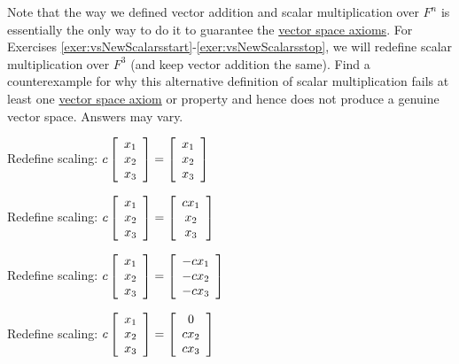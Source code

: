 \noindent Note that the way we defined vector addition and scalar multiplication over \hyperref[note:Fn]{$F^n$} is essentially the only way to do it to guarantee the \hyperref[def:vectorspace]{vector space axioms}. For Exercises \ref{exer:vsNewScalarsstart}-\ref{exer:vsNewScalarsstop}, we will redefine scalar multiplication over $F^3$ (and keep vector addition the same). Find a counterexample for why this alternative definition of scalar multiplication fails at least one \hyperref[def:vectorspace]{vector space axiom} or property and hence does not produce a genuine vector space. Answers may vary.
\begin{enumerate}[!HW!, label=$\spadesuit$ \arabic*., ref=\arabic*]
\begin{multicols}{2}
\item\label{exer:vsNewScalarsstart} Redefine scaling: $c\vr{x_1\\x_2\\x_3} = \vr{x_1\\x_2\\x_3}$
\item Redefine scaling: $c\vr{x_1\\x_2\\x_3} = \mtx{c}{cx_1\\x_2\\x_3}$
\end{multicols}
\begin{multicols}{2}
\item Redefine scaling: $c\vr{x_1\\x_2\\x_3} = \vr{-cx_1\\-cx_2\\-cx_3}$
\item\label{exer:vsNewScalarsstop} Redefine scaling: $c\vr{x_1\\x_2\\x_3} = \mtx{c}{0\\cx_2\\cx_3}$
\end{multicols}
\end{enumerate}

\pagebreak
\mbox{}\vfill

